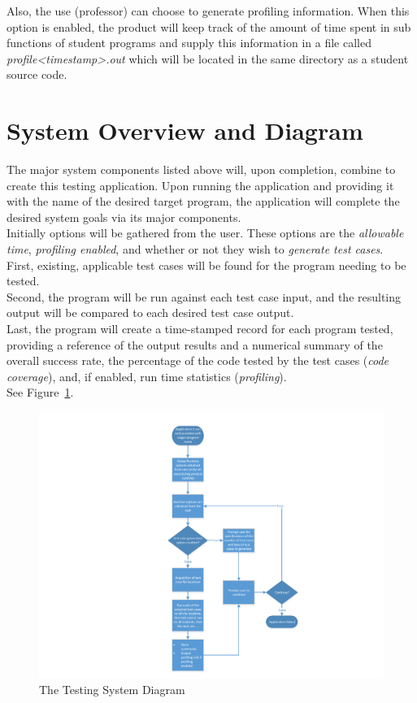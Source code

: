 Also, the use (professor) can choose to generate profiling information. When this option is enabled, the product will keep track of the amount of time spent in sub functions of student programs and supply this information in a file called \textit{profile\textless timestamp\textgreater .out} which will be located in the same directory as a student source code.

\section{System Overview and Diagram}
The major system components listed above will, upon completion, combine to create this testing application. 
Upon running the application and providing it with the name of the desired target program, the application
will complete the desired system goals via its major components.
\\ Initially options will be gathered from the user. These options are the \textit{allowable time},\textit{ profiling enabled}, and whether or not they wish to \textit{generate test cases}.
\\ First, existing, applicable test cases will be found for the program needing to be tested. 
\\ Second, the program will be run against each test case input, and the resulting output will be 
compared to each desired test case output.
\\  Last, the program will create a time-stamped record for each program tested, providing a reference of 
the output results and a numerical summary of the overall success rate, the percentage of the code tested by the test cases (\textit{code coverage}), and, if enabled, run time statistics (\textit{profiling}).  
\\ See Figure~\ref{systemdiagram}.
\begin{figure}[H]
\begin{center}
\includegraphics[width=1.0\textwidth]{./SystemDiagram}
\end{center}
\caption{The Testing System Diagram \label{systemdiagram}}
\end{figure}



